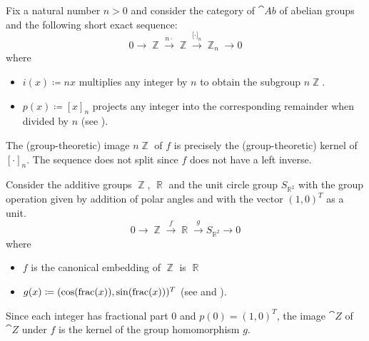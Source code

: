\begin{example}\label{ex:short_exact_sequences}
  \hfill
  \begin{thmenum}
     Fix a natural number \( n > 0 \) and consider the category of \( \cat{Ab} \) of abelian groups and the following short exact sequence:
    \begin{equation*}
      0
      \longrightarrow
      \BbbZ
      \overset {n \cdot} \longrightarrow
      \BbbZ
      \overset {\lbrack \cdot \rbrack_n} \longrightarrow
      \BbbZ_n
      \longrightarrow
      0
    \end{equation*}
    where
    \begin{itemize}
      \item \( i(x) \coloneqq nx \) multiplies any integer by \( n \) to obtain the subgroup \( n \BbbZ \).
      \item \( p(x) \coloneqq [x]_n \) projects any integer into the corresponding remainder when divided by \( n \) (see ).
    \end{itemize}

    The (group-theoretic) image \( n \BbbZ \) of \( f \) is precisely the (group-theoretic) kernel of \( [\cdot]_n \). The sequence does not split since \( f \) does not have a left inverse.

     Consider the additive groups \( \BbbZ \), \( \BbbR \) and the unit circle group \( S_{\BbbR^2} \) with the group operation given by addition of polar angles and with the vector \( (1, 0)^T \) as a unit.
    \begin{equation*}
      0
      \longrightarrow
      \BbbZ
      \overset f \longrightarrow
      \BbbR
      \overset g \longrightarrow
      S_{\BbbR^2}
      \longrightarrow
      0
    \end{equation*}
    where
    \begin{itemize}
      \item \( f \) is the canonical embedding of \( \BbbZ \) is \( \BbbR \)
      \item \( g(x) \coloneqq (\cos(\operatorname{frac}(x)), \sin(\operatorname{frac}(x)))^T \) (see  and ).
    \end{itemize}

    Since each integer has fractional part \( 0 \) and \( p(0) = (1, 0)^T \), the image \( \cat{Z} \) of \( \cat{Z} \) under \( f \) is the kernel of the group homomorphism \( g \).


\end{thmenum}
\end{example}
